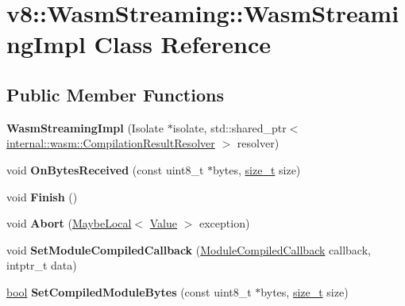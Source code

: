 \hypertarget{classv8_1_1WasmStreaming_1_1WasmStreamingImpl}{}\section{v8\+:\+:Wasm\+Streaming\+:\+:Wasm\+Streaming\+Impl Class Reference}
\label{classv8_1_1WasmStreaming_1_1WasmStreamingImpl}
\subsection*{Public Member Functions}
\begin{DoxyCompactItemize}
\item 
\mbox{\label{classv8_1_1WasmStreaming_1_1WasmStreamingImpl_a3dfc8d14b4b7933d5a2f8d19f3f703ec}} 
{\bfseries Wasm\+Streaming\+Impl} (Isolate $\ast$isolate, std\+::shared\+\_\+ptr$<$ \mbox{\hyperlink{classv8_1_1internal_1_1wasm_1_1CompilationResultResolver}{internal\+::wasm\+::\+Compilation\+Result\+Resolver}} $>$ resolver)
\item 
\mbox{\label{classv8_1_1WasmStreaming_1_1WasmStreamingImpl_ade7c90cc97041995c4fe8d05665250df}} 
void {\bfseries On\+Bytes\+Received} (const uint8\+\_\+t $\ast$bytes, \mbox{\hyperlink{classsize__t}{size\+\_\+t}} size)
\item 
\mbox{\label{classv8_1_1WasmStreaming_1_1WasmStreamingImpl_a6de1ef0a43abc38d42dd6d4fbcbdbbde}} 
void {\bfseries Finish} ()
\item 
\mbox{\label{classv8_1_1WasmStreaming_1_1WasmStreamingImpl_ab3ce37886d3c633d11057f3e54318ad6}} 
void {\bfseries Abort} (\mbox{\hyperlink{classv8_1_1MaybeLocal}{Maybe\+Local}}$<$ \mbox{\hyperlink{classv8_1_1Value}{Value}} $>$ exception)
\item 
\mbox{\label{classv8_1_1WasmStreaming_1_1WasmStreamingImpl_a7469d23b9d245e061c998d5a0ef83867}} 
void {\bfseries Set\+Module\+Compiled\+Callback} (\mbox{\hyperlink{classv8_1_1WasmStreaming_a2e8af849348cbd9fe9c3940ab010917d}{Module\+Compiled\+Callback}} callback, intptr\+\_\+t data)
\item 
\mbox{\label{classv8_1_1WasmStreaming_1_1WasmStreamingImpl_a86979b1f5bc7ada90af1f391326fab9e}} 
\mbox{\hyperlink{classbool}{bool}} {\bfseries Set\+Compiled\+Module\+Bytes} (const uint8\+\_\+t $\ast$bytes, \mbox{\hyperlink{classsize__t}{size\+\_\+t}} size)
\end{DoxyCompactItemize}


